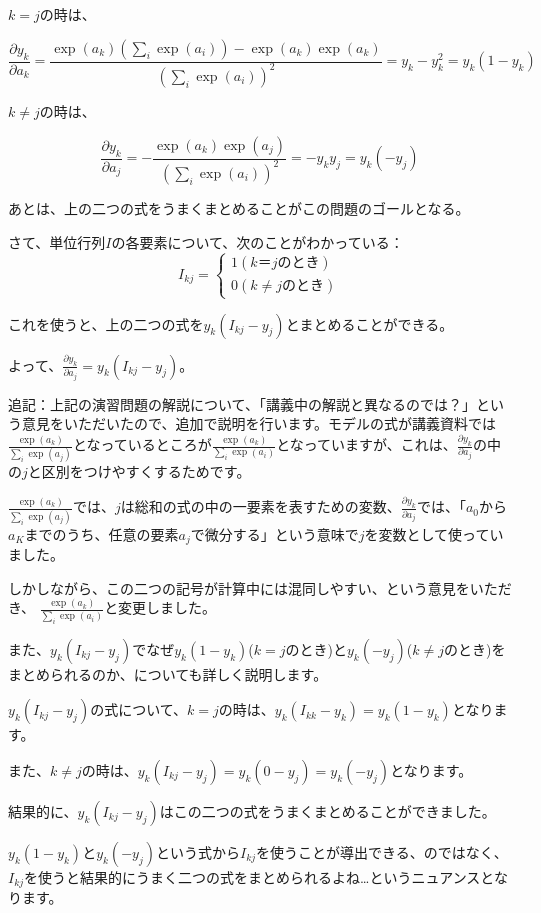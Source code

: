 $k = j$の時は、

\begin{equation*}
	\frac{\partial  y_k}{\partial a_k} = \frac{\exp(a_k) (\sum_i \exp(a_i)) - \exp (a_k) \exp(a_k) }{(\sum_i \exp(a_i))^2} = y_k - y_k^2 = y_k(1 - y_k)
\end{equation*}

$k \neq j$の時は、

\begin{equation*}
	\frac{\partial y_k}{\partial a_j} = -\frac{\exp(a_k) \exp(a_j) }{(\sum_i \exp(a_i))^2} =  -y_k y_j = y_k(-y_j)
\end{equation*}

あとは、上の二つの式をうまくまとめることがこの問題のゴールとなる。

さて、単位行列$I$の各要素について、次のことがわかっている：
\begin{equation*}
I_{kj} =  \left \{
\begin{array}{l}
1　(k＝jのとき) \\
0　(k≠jのとき)
\end{array}
\right.	
\end{equation*}

これを使うと、上の二つの式を$y_k (I_{kj} - y_j)$とまとめることができる。

よって、$\frac{\partial y_k}{\partial a_j} = y_k (I_{kj} - y_j)$。




追記：上記の演習問題の解説について、「講義中の解説と異なるのでは？」という意見をいただいたので、追加で説明を行います。モデルの式が講義資料では$\frac{\exp(a_{k})}{\sum_i \exp(a_{j}) }$となっているところが$\frac{\exp(a_{k})}{\sum_i \exp(a_{i}) }$となっていますが、これは、$\frac{\partial y_k}{\partial a_j}$の中の$j$と区別をつけやすくするためです。

$\frac{\exp(a_{k})}{\sum_i \exp(a_{j}) }$では、$j$は総和の式の中の一要素を表すための変数、$\frac{\partial y_k}{\partial a_j}$では、「$a_0$から$a_K$までのうち、任意の要素$a_j$で微分する」という意味で$j$を変数として使っていました。

しかしながら、この二つの記号が計算中には混同しやすい、という意見をいただき、 $\frac{\exp(a_{k})}{\sum_i \exp(a_{i}) }$と変更しました。


また、$ y_k (I_{kj} - y_j)$でなぜ$y_k(1 - y_k)$($k = j$のとき)と$y_k(-y_j)$($k \neq j$のとき)をまとめられるのか、についても詳しく説明します。

$ y_k (I_{kj} - y_j)$の式について、$k = j$の時は、$ y_k (I_{kk} - y_k) = y_k (1 - y_k)$となります。

また、$k \neq j$の時は、$ y_k (I_{kj} - y_j) = y_k (0 - y_j) = y_k (- y_j)$となります。

結果的に、$ y_k (I_{kj} - y_j)$はこの二つの式をうまくまとめることができました。

$y_k(1 - y_k)$と$y_k(-y_j)$という式から$I_{kj}$を使うことが導出できる、のではなく、$I_{kj}$を使うと結果的にうまく二つの式をまとめられるよね…というニュアンスとなります。







